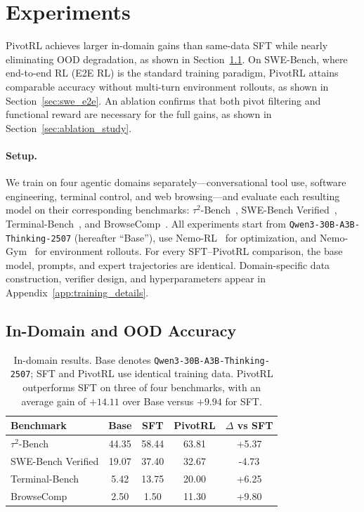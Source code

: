 \section{Experiments}
\label{sec:experiments}

PivotRL achieves larger in-domain gains than same-data SFT while nearly eliminating OOD degradation, as shown in Section~\ref{sec:indomain_ood_sft}. On SWE-Bench, where end-to-end RL (E2E RL) is the standard training paradigm, PivotRL attains comparable accuracy without multi-turn environment rollouts, as shown in Section~\ref{sec:swe_e2e}. An ablation confirms that both pivot filtering and functional reward are necessary for the full gains, as shown in Section~\ref{sec:ablation_study}.

\paragraph{Setup.}
We train on four agentic domains separately---conversational tool use, software engineering, terminal control, and web browsing---and evaluate each resulting model on their corresponding benchmarks: $\tau^2$-Bench~\citep{barres2025tau2bench}, SWE-Bench Verified~\citep{jimenez2024swebench}, Terminal-Bench~\citep{tbench_2025}, and BrowseComp~\citep{wei2025browsecompsimplechallengingbenchmark}. All experiments start from \texttt{Qwen3-30B-A3B-Thinking-2507} (hereafter ``Base''), use Nemo-RL~\citep{nemo-rl} for optimization, and Nemo-Gym~\citep{nemo-gym} for environment rollouts. For every SFT--PivotRL comparison, the base model, prompts, and expert trajectories are identical. Domain-specific data construction, verifier design, and hyperparameters appear in Appendix~\ref{app:training_details}.

\subsection{In-Domain and OOD Accuracy}
\label{sec:indomain_ood_sft}

\begin{table}[t]
\centering
\small
\begin{tabular}{lcccc}
\toprule
\textbf{Benchmark} & \textbf{Base} & \textbf{SFT} & \textbf{PivotRL} & \textbf{$\Delta$ vs SFT} \\
\midrule
$\tau^2$-Bench   & 44.35 & 58.44 & 63.81 & +5.37 \\
SWE-Bench Verified     & 19.07 & 37.40 & 32.67 & -4.73 \\
Terminal-Bench   & 5.42  & 13.75 & 20.00 & +6.25 \\
BrowseComp       & 2.50  & 1.50  & 11.30 & +9.80 \\
\bottomrule
\end{tabular}
\caption{
In-domain results. Base denotes \texttt{Qwen3-30B-A3B-Thinking-2507}; SFT and PivotRL use identical training data. PivotRL outperforms SFT on three of four benchmarks, with an average gain of $+14.11$ over Base versus $+9.94$ for SFT.
}
\label{tab:single_domain_main_results}
\end{table}

